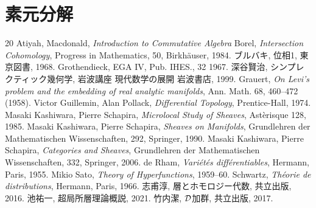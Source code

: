 \chapter{素元分解}
\begin{thebibliography}{20} 
     Atiyah, Macdonald, \textit{Introduction to Commutative Algebra} 
     Borel, 
        \textit{Intersection Cohomology}, 
        Progress in Mathematics, 50, Birkh\"auser, 1984.
     ブルバキ, 位相1, 東京図書, 1968.
     Grothendieck, EGA IV, Pub. IHES., 32 1967.
     深谷賢治, シンプレクティック幾何学, 岩波講座 現代数学の展開 岩波書店, 1999.
     Grauert, 
        \textit{On Levi's problem and the embedding of real analytic manifolds}, 
        Ann. Math. 68, 460--472 (1958).
     Victor Guillemin, Alan Pollack, 
        \textit{Differential Topology}, 
        Prentice-Hall, 1974.
     Masaki Kashiwara, Pierre Schapira, 
        \textit{Microlocal Study of Sheaves}, 
        Ast\`erisque 128, 1985.
     Masaki Kashiwara, Pierre Schapira, 
        \textit{Sheaves on Manifolds}, 
        Grundlehren der Mathematischen Wissenschaften, 292, Springer, 1990.
     Masaki Kashiwara, Pierre Schapira, 
        \textit{Categories and Sheaves}, 
        Grundlehren der Mathematischen Wissenschaften, 332, Springer, 2006.
     de Rham, 
        \textit{Vari\'et\'es diff\'erentiables}, 
        Hermann, Paris, 1955.
     Mikio Sato, 
        \textit{Theory of Hyperfunctions}, 
        1959--60.
     Schwartz, 
        \textit{Th\'eorie de distributions}, 
        Hermann, Paris, 1966.
     志甫淳, 層とホモロジー代数, 共立出版, 2016.
     池祐一, 超局所層理論概説, 2021.
     竹内潔, \(\mathcal{D}\)加群, 共立出版, 2017.
\end{thebibliography}





